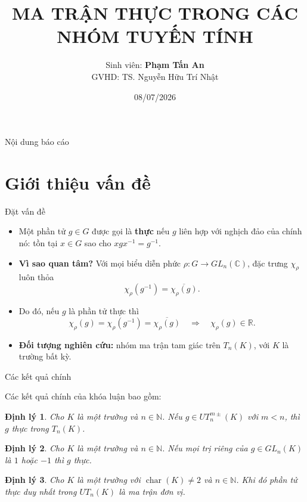 \documentclass[11pt, aspectratio=169]{beamer}
\title[Ma trận thực trong nhóm tuyến tính]{MA TRẬN THỰC TRONG CÁC NHÓM TUYẾN TÍNH}
\author[Phạm Tấn An]{Sinh viên: \textbf{Phạm Tấn An} \texorpdfstring{\\}{ - } GVHD: TS. Nguyễn Hữu Trí Nhật}
\institute[HCMUS]{Khoa Toán - Tin học \\ Trường Đại học Khoa học Tự nhiên, ĐHQG-HCM}
\date{08/07/2026}
\theoremstyle{plain}
\newtheorem{thm}{Định lý}
\theoremstyle{definition}
\theoremstyle{remark}
\DeclareMathOperator{\Char}{char}
\begin{document}
\begin{frame}
    \titlepage
\end{frame}
\begin{frame}{Nội dung báo cáo}
    \tableofcontents
\end{frame}

\section{Giới thiệu vấn đề}

\begin{frame}{Đặt vấn đề}
    \begin{itemize}
        \item Một phần tử \( g \in G \) được gọi là \textbf{thực} nếu \( g \) liên hợp với nghịch đảo của chính nó: tồn tại \( x \in G \) sao cho \( xgx^{-1} = g^{-1} \).
        \item \textbf{Vì sao quan tâm?} Với mọi biểu diễn phức \( \rho: G \to GL_n(\mathbb{C}) \), đặc trưng \( \chi_\rho \) luôn thỏa
        \[
            \chi_\rho(g^{-1}) = \overline{\chi_\rho(g)}.
        \]
        \item Do đó, nếu \( g \) là phần tử thực thì
        \[
            \chi_\rho(g) = \chi_\rho(g^{-1}) = \overline{\chi_\rho(g)} \quad \Longrightarrow \quad \chi_\rho(g) \in \mathbb{R}.
        \]
        \item \textbf{Đối tượng nghiên cứu:} nhóm ma trận tam giác trên \( T_n(K) \), với \( K \) là trường bất kỳ.
    \end{itemize}
\end{frame}

\begin{frame}{Các kết quả chính}

Các kết quả chính của khóa luận bao gồm:

\begin{thm} \label{thm:main1.1} 
    Cho \( K \) là một trường và \( n \in \mathbb{N} \). Nếu \( g \in UT_n^{m \pm}(K) \) với \( m < n \), thì \( g \) thực trong \( T_n(K) \).
\end{thm}

\begin{thm} \label{thm:main1.2}
    Cho \( K \) là một trường và \( n \in \mathbb{N} \). Nếu mọi trị riêng của \( g \in GL_n(K) \) là \( 1 \) hoặc \( -1 \) thì \( g \) thực.
\end{thm}

\begin{thm} \label{thm:main1.3}
    Cho $K$ là một trường với $\Char(K) \neq 2$ và $n \in \mathbb{N}$. Khi đó phần tử thực duy nhất trong $UT_n(K)$ là ma trận đơn vị.
\end{thm}

\end{frame}
\end{document}
